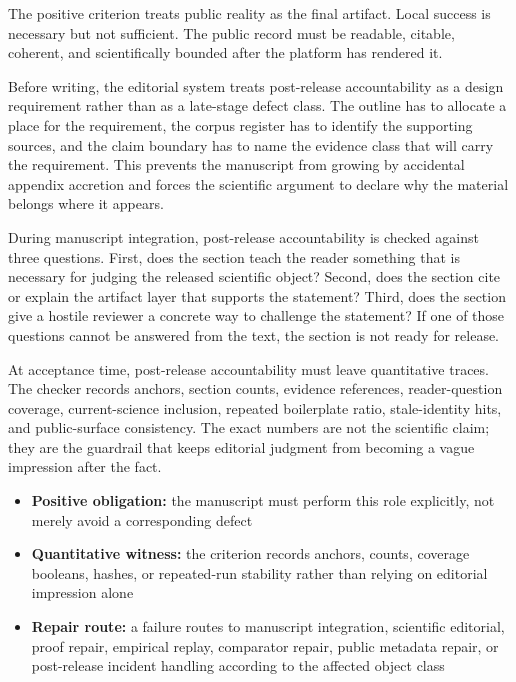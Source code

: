 The positive criterion treats public reality as the final artifact. Local success is necessary but not sufficient. The public record must be readable, citable, coherent, and scientifically bounded after the platform has rendered it.


Before writing, the editorial system treats post-release accountability as a design requirement rather than as a late-stage defect class. The outline has to allocate a place for the requirement, the corpus register has to identify the supporting sources, and the claim boundary has to name the evidence class that will carry the requirement. This prevents the manuscript from growing by accidental appendix accretion and forces the scientific argument to declare why the material belongs where it appears.


During manuscript integration, post-release accountability is checked against three questions. First, does the section teach the reader something that is necessary for judging the released scientific object? Second, does the section cite or explain the artifact layer that supports the statement? Third, does the section give a hostile reviewer a concrete way to challenge the statement? If one of those questions cannot be answered from the text, the section is not ready for release.


At acceptance time, post-release accountability must leave quantitative traces. The checker records anchors, section counts, evidence references, reader-question coverage, current-science inclusion, repeated boilerplate ratio, stale-identity hits, and public-surface consistency. The exact numbers are not the scientific claim; they are the guardrail that keeps editorial judgment from becoming a vague impression after the fact.


\begin{itemize}[leftmargin=1.8em]

\item \textbf{Positive obligation:} the manuscript must perform this role explicitly, not merely avoid a corresponding defect

\item \textbf{Quantitative witness:} the criterion records anchors, counts, coverage booleans, hashes, or repeated-run stability rather than relying on editorial impression alone

\item \textbf{Repair route:} a failure routes to manuscript integration, scientific editorial, proof repair, empirical replay, comparator repair, public metadata repair, or post-release incident handling according to the affected object class

\end{itemize}


